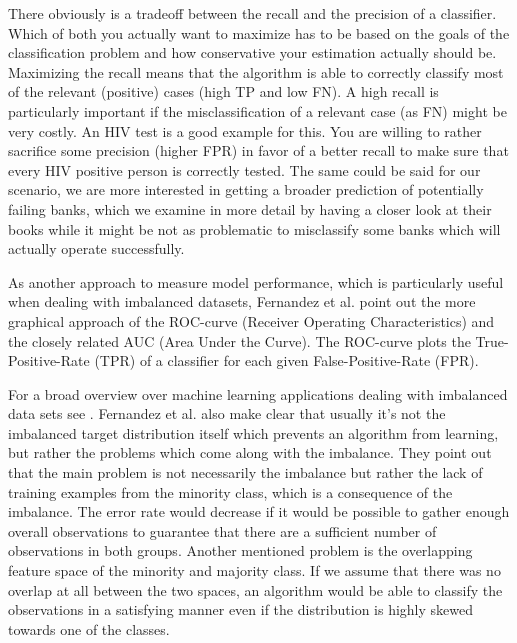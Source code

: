 \documentclass[12pt,a4paper]{article}
\begin{document}
There obviously is a tradeoff between the recall and the precision of a classifier. Which of both you actually want to maximize has to be based on the goals of the classification problem and how conservative your estimation actually should be. Maximizing the recall means that the algorithm is able to correctly classify most of the relevant (positive) cases (high TP and low FN). A high recall is particularly important if the misclassification of a relevant case (as FN) might be very costly. An HIV test is a good example for this. You are willing to rather sacrifice some precision (higher FPR) in favor of a better recall to make sure that every HIV positive person is correctly tested. The same could be said for our scenario, we are more interested in getting a broader prediction of potentially failing banks, which we examine in more detail by having a closer look at their books while it might be not as problematic to misclassify some banks which will actually operate successfully.

As another approach to measure model performance, which is particularly useful when dealing with imbalanced datasets, Fernandez et al. point out the more graphical approach of the ROC-curve (Receiver Operating Characteristics) and the closely related AUC (Area Under the Curve). The ROC-curve plots the True-Positive-Rate (TPR) of a classifier for each given False-Positive-Rate (FPR). 

For a broad overview over machine learning applications dealing with imbalanced data sets see \cite{fernandez2018learning}. Fernandez et al. also make clear that usually it's not the imbalanced target distribution itself which prevents an algorithm from learning, but rather the problems which come along with the imbalance. They point out that the main problem is not necessarily the imbalance but rather the lack of training examples from the minority class, which is a consequence of the imbalance. The error rate would decrease if it would be possible to gather enough overall observations to guarantee that there are a sufficient number of observations in both groups. Another mentioned problem is the overlapping feature space of the minority and majority class. If we assume that there was no overlap at all between the two spaces, an algorithm would be able to classify the observations in a satisfying manner even if the distribution is highly skewed towards one of the classes.
\end{document}
